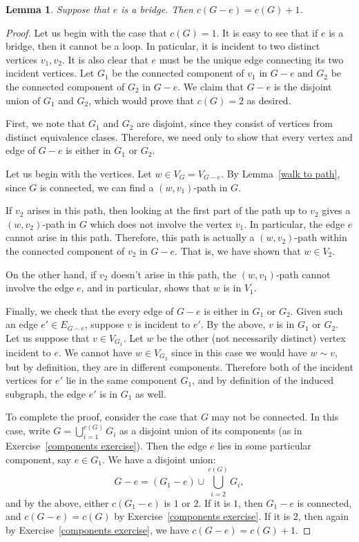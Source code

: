 \documentclass[12pt]{report}
\theoremstyle{plain}
\newtheorem{lem}[thm]{Lemma}
\begin{document}
\begin{lem} \label{lem:components plus 1}
Suppose that $e$ is a bridge. Then $c(G - e) = c(G) + 1$.
\end{lem}
\begin{proof}
Let us begin with the case that $c(G) = 1$.  It is easy to see that if $e$
is a bridge, then it cannot be a loop.  In paticular, it is incident to two
distinct vertices $v_1, v_2$.  It is also clear that $e$ must be the unique
edge connecting its two incident vertices.  Let $G_1$ be the connected
component of $v_1$ in $G - e$ and $G_2$ be the connected component of $G_2$
in $G - e$. We claim that $G - e$ is the disjoint union of $G_1$ and $G_2$,
which would prove that $c(G) = 2$ as desired. 

First, we note that $G_1$ and $G_2$ are disjoint, since they consist of
vertices from distinct equivalence clases. Therefore, we need only to show
that every vertex and edge of $G - e$ is either in $G_1$ or $G_2$. 

Let us begin with the vertices. Let $w \in V_G = V_{G - e}$. By
Lemma~\ref{walk to path}, since $G$ is connected, we can find a $(w,
v_1)$-path in $G$.

If $v_2$ arises in this path, then looking at the first part of the path up
to $v_2$ gives a $(w, v_2)$-path in $G$ which does not involve the vertex
$v_1$. In particular, the edge $e$ cannot arise in this path. Therefore,
this path is actually a $(w, v_2)$-path within the connected component of
$v_2$ in $G - e$. That is, we have shown that $w \in V_2$. 

On the other hand, if $v_2$ doesn't arise in this path, the $(w, v_1)$-path
cannot involve the edge $e$, and in particular, shows that $w$ is in $V_1$.

Finally, we check that the every edge of $G - e$ is either in $G_1$ or
$G_2$. Given such an edge $e' \in E_{G - e}$, suppose $v$ is incident to
$e'$. By the above, $v$ is in $G_1$ or $G_2$. Let us suppose that $v \in
V_{G_1}$. Let $w$ be the other (not necessarily distinct) vertex incident
to $e$. We cannot have $w \in V_{G_2}$ since in this case we would have $w
\sim v$, but by definition, they are in different components. Therefore
both of the incident vertices for $e'$ lie in the same component $G_1$, and
by definition of the induced subgraph, the edge $e'$ is in $G_1$ as well.

To complete the proof, consider the case that $G$ may not be connected. In
this case, write $G = \bigcup_{i = 1}^{c(G)} G_i$ as a disjoint union of its
components (as in Exercise~\ref{components exercise}). Then the edge $e$
lies in some particular component, say $e \in G_1$. We have a disjoint
union:
\[ G - e = (G_1 - e) \cup \bigcup_{i = 2}^{c(G)} G_i, \]
and by the above, either $c(G_1 - e)$ is $1$ or $2$. If it is $1$, then
$G_1 - e$ is connected, and $c(G - e) = c(G)$ by Exercise~\ref{components
exercise}.  If it is $2$, then again by Exercise~\ref{components exercise},
we have $c(G - e) = c(G) + 1$.
\end{proof}
\end{document}

